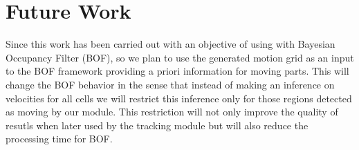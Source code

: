 \section{Future Work}
Since this work has been carried out with an objective of using with Bayesian Occupancy Filter (BOF), so we plan to use the generated motion grid as an input to the BOF framework providing a priori information for moving parts. This will change the BOF behavior in the sense that instead of making an inference on velocities for all cells we will restrict this inference only for those regions detected as moving by our module. This restriction will not only improve the quality of resutls when later used by the tracking module but will also reduce the processing time for BOF.